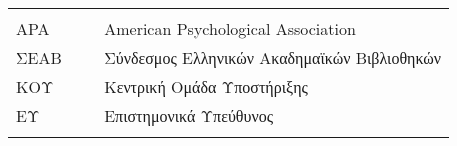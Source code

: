 
\begin{table} [ht] \centering 
\begin{tabular} {p{0.20\linewidth} p{0.80\linewidth}}

\hline
		&	    	\tabularnewline
APA		& American Psychological Association 		\tabularnewline
ΣΕΑΒ		& Σύνδεσμος Ελληνικών Ακαδημαϊκών Βιβλιοθηκών	\tabularnewline
ΚΟΥ		& Κεντρική Ομάδα Υποστήριξης	 		\tabularnewline
ΕΥ		& Επιστημονικά Υπεύθυνος			\tabularnewline
		&	    	\tabularnewline
\hline
\end{tabular}
\label{table:acronyms}
\end{table} 
